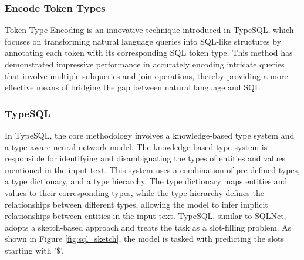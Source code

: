 \subsubsection{Encode Token Types}

Token Type Encoding is an innovative technique introduced in TypeSQL\cite{DBLP:journals/corr/abs-1804-09769}, which focuses on transforming natural language queries into SQL-like structures by annotating each token with its corresponding SQL token type. This method has demonstrated impressive performance in accurately encoding intricate queries that involve multiple subqueries and join operations, thereby providing a more effective means of bridging the gap between natural language and SQL.

\subsubsection*{TypeSQL}

In TypeSQL, the core methodology involves a knowledge-based type system and a type-aware neural network model\cite{DBLP:journals/corr/abs-1804-09769}. The knowledge-based type system is responsible for identifying and disambiguating the types of entities and values mentioned in the input text. This system uses a combination of pre-defined types, a type dictionary, and a type hierarchy. The type dictionary maps entities and values to their corresponding types, while the type hierarchy defines the relationships between different types, allowing the model to infer implicit relationships between entities in the input text.
TypeSQL, similar to SQLNet, adopts a sketch-based approach and treats the task as a slot-filling problem. As shown in Figure \ref{fig:sql_sketch}, the model is tasked with predicting the slots starting with '\$'.



